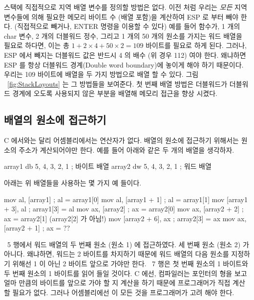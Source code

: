 스택에 직접적으로 지역 배열 변수를 정의할 방법은 없다. 이전 처럼 우리는 \emph{모든} 지역 변수들에
의해 필요한 메모리 바이트 수 (배열 포함)을 계산하여 ESP 로 부터 빼야 한다. (직접적으로 빼거나, 
{\code ENTER} 명령을 이용할 수 있다) 예를 들어 함수가, 1 개의 char 변수, 2 개의 더블워드 정수,
그리고 1 개의 50 개의 원소를 가지는 워드 배열을 필요로 하다면, 이는 총 $1 + 2 \times 4 + 50 \times 2 =
109$ 바이트를 필요로 하게 된다. 그러나, ESP 에서 빼지는 더블워드 값은 반드시 4 의 배수 (위 경우 112) 여야
한다. 왜냐하면 ESP 를 항상 더블워드 경계(Double word boundary)에 놓이게 해야 하기 때문이다. 우리는 109 바이트에 배열을 두 가지
방법으로 배열 할 수 있다. 그림 ~\ref{fig:StackLayouts} 는 그 방법들을 보여준다. 
첫 번째 배열 방법은 더블워드가 더블워드 경계에 오도록 사용되지 않은 부분을 배열해 메모리 접근을
향상 시켰다. 


\subsection{배열의 원소에 접근하기}

C 에서와는 달리 어셈블리에서는 {\code []} 연산자가 없다. 배열의 원소에 접근하기 위해서는
원소의 주소가 계산되어야만 한다. 예를 들어 아래와 같은 두 개의 배열을 생각하자. 

\begin{AsmCodeListing}[frame=none, numbers=none]
array1       db     5, 4, 3, 2, 1     ; 바이트 배열
array2       dw     5, 4, 3, 2, 1     ; 워드 배열
\end{AsmCodeListing}
아래는 위 배열들을 사용하는 몇 가지 예 들이다. 

\begin{AsmCodeListing}[frame=none]
      mov    al, [array1]             ; al = array1[0]
      mov    al, [array1 + 1]         ; al = array1[1]
      mov    [array1 + 3], al         ; array1[3] = al
      mov    ax, [array2]             ; ax = array2[0]
      mov    ax, [array2 + 2]         ; ax = array2[1] (array2[2] 가 아님!)
      mov    [array2 + 6], ax         ; array2[3] = ax
      mov    ax, [array2 + 1]         ; ax = ??
\end{AsmCodeListing}
~5 행에서 워드 배열의 두 번째 원소 (원소 1) 에 접근하였다. 세 번째 원소 (원소 2)
가 아니다. 왜냐하면, 워드는 2 바이트를 차지하기 때문에 워드 배열의 다음 원소를
지정하기 위해선 1 이 아닌 2 바이트 앞으로 가야만 한다. ~7 행은 첫 번째 원소의 1 바이트와
두 번째 원소의 1 바이트를 읽어 들일 것이다. C 에선, 컴파일러는 포인터의 형을 보고 
얼마 만큼의 바이트를 앞으로 가야 할 지 계산을 하기 때문에 프로그래머가 직접 계산 할 필요가 없다.
그러나 어셈블리에선 이 모든 것을 프로그래머가 고려 해야 한다. 

